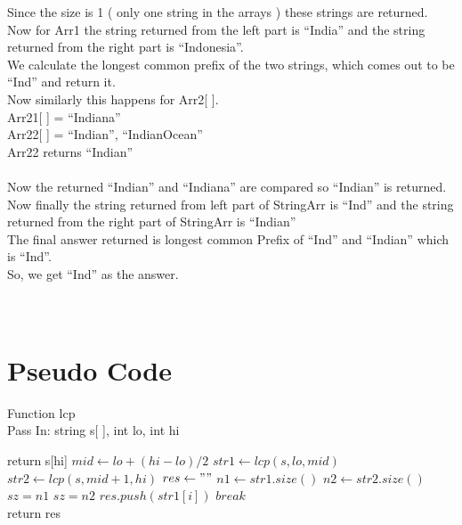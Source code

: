 \documentclass[conference]{IEEEtran}
\begin{document}
\begin{enumerate}
Since the size is 1 ( only one string in the arrays ) these strings are returned.\\
Now for Arr1 the string returned from the left part is “India” and the string returned from the right part is “Indonesia”.\\

We calculate the longest common prefix of the two strings, which comes out to be “Ind” and return it.\\

Now similarly this happens for Arr2[ ].\\

Arr21[ ] = { “Indiana” } \\
Arr22[ ] = { “Indian”, “IndianOcean” } \\

Arr22 returns “Indian”\\\\

Now the returned “Indian” and “Indiana” are compared so “Indian” is returned.\\

Now finally the string returned from left part of StringArr is “Ind” and the string returned from the right part of StringArr is “Indian” \\

The final answer returned is longest common Prefix of “Ind” and “Indian” which is “Ind”.\\

So, we get “Ind” as the answer.\\ \\ \\


\end{enumerate}

\section{\textbf{Pseudo Code}} 
\noindent Function lcp \\
Pass In: string s[ ], int lo, int hi\\
\begin{algorithmic}
		\STATE return s[hi]
	\ENDIF
	  \STATE  $mid \gets lo+(hi-lo)/2 $
	   \STATE	$str1 \gets lcp(s,lo,mid)$
	    \STATE	$str2 \gets lcp(s,mid+1,hi)$
        \STATE   $res  \gets  {""}$
        \STATE  $n1 \gets str1.size() $
        \STATE  $n2 \gets str2.size()$ 
            \STATE	$sz=n1$
        \ELSE	
            \STATE	$sz=n2$
        \ENDIF
                \STATE $res.push(str1[i])$
             \ELSE 
                \STATE $break$
            \ENDIF
        \ENDFOR
    \ENDIF \\
return res
\end{algorithmic}
\end{document}
